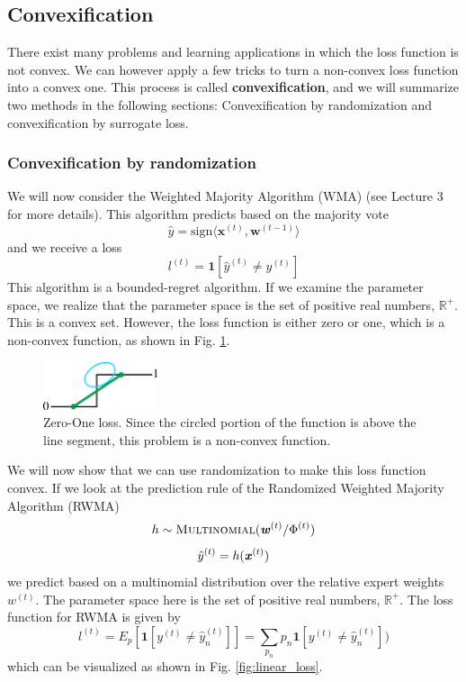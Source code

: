 \documentclass[11pt]{article}
\begin{document}
\subsection{Convexification}
There exist many problems and learning applications in which the loss function is not convex. We can however apply a few tricks to turn a non-convex loss function into a convex one. This process is called \textbf{convexification}, and we will summarize two methods in the following sections: Convexification by randomization and convexification by surrogate loss.

\subsubsection*{Convexification by randomization}
We will now consider the Weighted Majority Algorithm (WMA) (see Lecture 3 for more details). This algorithm predicts based on the majority vote 
\begin{equation*}
    \hat{y}=\text{sign} \langle \boldsymbol{x}^{(t)}, \boldsymbol{w}^{(t-1)}\rangle
\end{equation*}
and we receive a loss 
\begin{equation*}
    l^{(t)} = \mathbf{1}[\hat{y}^{(t)}\neq y^{(t)}]
\end{equation*}
This algorithm is a bounded-regret algorithm.
If we examine the parameter space, we realize that the parameter space is the set of positive real numbers, $\mathbb{R}^+$. This is a convex set.
However, the loss function is either zero or one, which is a non-convex function, as shown in Fig. \ref{fig:zero_one_loss}.
\begin{figure}[ht]
    \centering
    \includegraphics[width=0.3\textwidth]{0_1_loss.png}
    \caption{Zero-One loss. Since the circled portion of the function is above the line segment, this problem is a non-convex function.}
    \label{fig:zero_one_loss}
\end{figure}
We will now show that we can use randomization to make this loss function convex. If we look at the prediction rule of the Randomized Weighted Majority Algorithm (RWMA)
\begin{equation*}
    h \sim \textsc{Multinomial}(\textbf{\textit{w}}^{(t)}/ \Phi^{(t)})
\end{equation*}
\begin{equation*}
    \hat{y}^{(t)} = h(\textbf{\textit{x}}^{(t)})
\end{equation*}
we predict based on a multinomial distribution over the relative expert weights $w^{(t)}$.
The parameter space here is the set of positive real numbers, $\mathbb{R}^+$. The loss function for RWMA is given by
\begin{equation*}
    l^{(t)}=E_p[\textbf{1}[y^{(t)}\neq \hat{y}_n^{(t)}]]=\sum_{p_n} p_n \textbf{1}[y^{(t)}\neq \hat{y}_n^{(t)}])
\end{equation*}
which can be visualized as shown in Fig. \ref{fig:linear_loss}.
\end{document}
